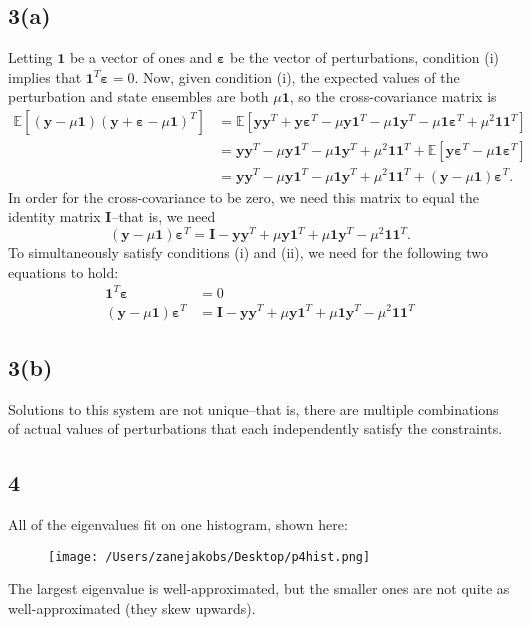 \documentclass[11pt]{article}
\begin{document}
\subsection*{3(a)} Letting $\bm{1}$ be a vector of ones and $\bm{\varepsilon}$ be the vector of perturbations, condition (i) implies that $\bm{1}^T\bm{\varepsilon} = 0.$ Now, given condition (i), the expected values of the perturbation and state ensembles are both $\mu\bm{1}$, so the cross-covariance matrix is 
\[
\begin{aligned}
\mathbb{E}[(\bm{y} - \mu\bm{1})(\bm{y} + \bm{\varepsilon} - \mu\bm{1})^T] &= \mathbb{E}[\bm{y}\bm{y}^T + \bm{y}\bm{\varepsilon}^T - \mu\bm{y}\bm{1}^T - \mu\bm{1}\bm{y}^T - \mu\bm{1}\bm{\varepsilon}^T + \mu^2 \bm{1}\bm{1}^T]\\
&= \bm{y}\bm{y}^T- \mu\bm{y}\bm{1}^T - \mu\bm{1}\bm{y}^T + \mu^2 \bm{1}\bm{1}^T + \mathbb{E}[\bm{y}\bm{\varepsilon}^T - \mu\bm{1}\bm{\varepsilon}^T]\\
&= \bm{y}\bm{y}^T- \mu\bm{y}\bm{1}^T - \mu\bm{1}\bm{y}^T + \mu^2 \bm{1}\bm{1}^T + (\bm{y} - \mu\bm{1})\bm{\varepsilon}^T. \end{aligned}
\]
In order for the cross-covariance to be zero, we need this matrix to equal the identity matrix $\bm{I}$--that is, we need 
\[
(\bm{y} - \mu\bm{1})\bm{\varepsilon}^T = \bm{I} - \bm{y}\bm{y}^T+ \mu\bm{y}\bm{1}^T + \mu\bm{1}\bm{y}^T - \mu^2 \bm{1}\bm{1}^T.
\]
To simultaneously satisfy conditions (i) and (ii), we need for the following two equations to hold:
\[
\begin{aligned}
\bm{1}^T\bm{\varepsilon} &= 0\\
(\bm{y} - \mu\bm{1})\bm{\varepsilon}^T &= \bm{I} - \bm{y}\bm{y}^T+ \mu\bm{y}\bm{1}^T + \mu\bm{1}\bm{y}^T - \mu^2 \bm{1}\bm{1}^T
\end{aligned}
\]
\subsection*{3(b)} Solutions to this system are not unique--that is, there are multiple combinations of actual values of perturbations that each independently satisfy the constraints.

\subsection*{4} All of the eigenvalues fit on one histogram, shown here:\\
\begin{figure}[H]
\texttt{[image: /Users/zanejakobs/Desktop/p4hist.png]}
\end{figure}
The largest eigenvalue is well-approximated, but the smaller ones are not quite as well-approximated (they skew upwards).
\end{document}
